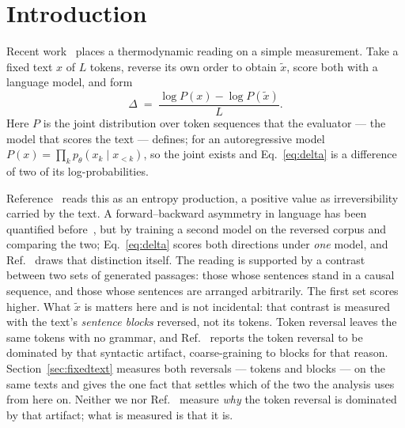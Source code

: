 %
%

\section{Introduction}
\label{sec:introduction}

Recent work~\cite{sagawa2026} places a thermodynamic reading on a simple
measurement.  Take a fixed text $x$ of $L$ tokens, reverse its own
order to obtain $\tilde{x}$, score both with a language model, and form
\begin{equation}
\Delta \;=\; \frac{\log P(x) - \log P(\tilde{x})}{L} .
\label{eq:delta}
\end{equation}
Here $P$ is the joint distribution over token sequences that the evaluator
--- the model that scores the text --- defines; for an autoregressive model $P(x) = \prod_k p_\theta(x_k \mid
x_{<k})$, so the joint exists and Eq.~\eqref{eq:delta} is a difference of two
of its log-probabilities.

Reference~\cite{sagawa2026} reads this as an entropy production, a positive
value as irreversibility carried by the text.  A forward--backward
asymmetry in language has been quantified before~\cite{arrow}, but by training
a second model on the reversed corpus and comparing the two;
Eq.~\eqref{eq:delta} scores both directions under \emph{one} model, and
Ref.~\cite{sagawa2026} draws that distinction itself.  The reading is
supported by a contrast between two sets of generated passages: those whose
sentences stand in a causal sequence, and those whose sentences are arranged
arbitrarily.  The first set scores higher.  What $\tilde{x}$ is matters here
and is not incidental: that contrast is measured with the text's
\emph{sentence blocks} reversed, not its tokens.
Token reversal leaves the same tokens with no grammar, and
Ref.~\cite{sagawa2026} reports the token reversal to be dominated by that
syntactic artifact, coarse-graining to blocks for that reason.
Section~\ref{sec:fixedtext} measures both reversals --- tokens and blocks
--- on the same texts and gives the one fact that settles which of the two
the analysis uses from here on.  Neither we nor Ref.~\cite{sagawa2026}
measure \emph{why} the token reversal is dominated by that artifact; what is
measured is that it is.

